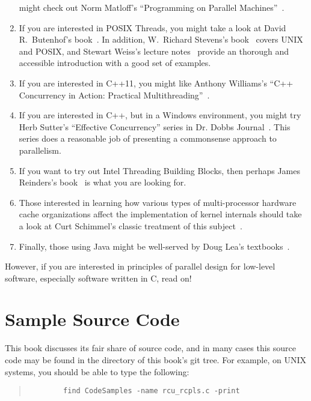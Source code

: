 \begin{enumerate}
	might check out Norm Matloff's ``Programming on
	Parallel Machines''~\cite{NormMatloff2013ParProcBook}.
\item	If you are interested in POSIX Threads, you might take
	a look at David R.~Butenhof's book~\cite{Butenhof1997pthreads}.
	In addition,
	W.~Richard Stevens's book~\cite{WRichardStevens1992}
	covers UNIX and POSIX, and Stewart Weiss's lecture
	notes~\cite{StewartWeiss2013UNIX} provide an
	thorough and accessible introduction with a good set of
	examples.
\item	If you are interested in C++11, you might like
	Anthony Williams's ``C++ Concurrency in Action: Practical
	Multithreading''~\cite{AnthonyWilliams2012}.
\item	If you are interested in C++, but in a Windows environment,
	you might try Herb Sutter's ``Effective Concurrency''
	series in
	Dr. Dobbs Journal~\cite{HerbSutter2008EffectiveConcurrency}.
	This series does a reasonable job of presenting a
	commonsense approach to parallelism.
\item	If you want to try out Intel Threading Building Blocks,
	then perhaps James Reinders's book~\cite{Reinders2007Textbook}
	is what you are looking for.
\item	Those interested in learning how various types of multi-processor
	hardware
	cache organizations affect the implementation of kernel
	internals should take a look at Curt Schimmel's classic
	treatment of this subject~\cite{Schimmel:1994:USM:175689}.
\item	Finally, those using Java might be well-served by Doug Lea's
	textbooks~\cite{DougLea1997Textbook,Goetz2007Textbook}.
\end{enumerate}

However, if you are interested in principles of parallel design
for low-level software, especially software written in C, read on!

\section{Sample Source Code}
\label{sec:howto:Sample Source Code}

This book discusses its fair share of source code, and in many cases
this source code may be found in the  directory
of this book's git tree.
For example, on UNIX systems, you should be able to type the following:

\begin{quote}
	{\scriptsize
	\begin{verbatim}
		find CodeSamples -name rcu_rcpls.c -print
	\end{verbatim}
	}
\end{quote}

